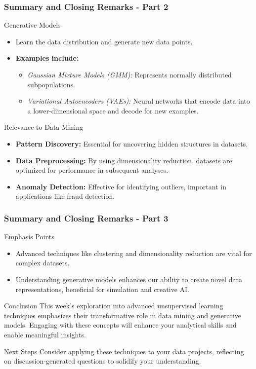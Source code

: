 \documentclass[aspectratio=169]{beamer}
\begin{document}
\begin{frame}[fragile]
  \frametitle{Summary and Closing Remarks - Part 2}
  \begin{block}{Generative Models}
    \begin{itemize}
      \item Learn the data distribution and generate new data points.
      \item \textbf{Examples include:}
      \begin{itemize}
        \item \textit{Gaussian Mixture Models (GMM):} Represents normally distributed subpopulations.
        \item \textit{Variational Autoencoders (VAEs):} Neural networks that encode data into a lower-dimensional space and decode for new examples.
      \end{itemize}
    \end{itemize}
  \end{block}

  \begin{block}{Relevance to Data Mining}
    \begin{itemize}
      \item \textbf{Pattern Discovery:} Essential for uncovering hidden structures in datasets.
      \item \textbf{Data Preprocessing:} By using dimensionality reduction, datasets are optimized for performance in subsequent analyses.
      \item \textbf{Anomaly Detection:} Effective for identifying outliers, important in applications like fraud detection.
    \end{itemize}
  \end{block}
\end{frame}

\begin{frame}[fragile]
  \frametitle{Summary and Closing Remarks - Part 3}
  \begin{block}{Emphasis Points}
    \begin{itemize}
      \item Advanced techniques like clustering and dimensionality reduction are vital for complex datasets.
      \item Understanding generative models enhances our ability to create novel data representations, beneficial for simulation and creative AI.
    \end{itemize}
  \end{block}

  \begin{block}{Conclusion}
    This week's exploration into advanced unsupervised learning techniques emphasizes their transformative role in data mining and generative models. Engaging with these concepts will enhance your analytical skills and enable meaningful insights.
  \end{block}

  \begin{block}{Next Steps}
    Consider applying these techniques to your data projects, reflecting on discussion-generated questions to solidify your understanding.
  \end{block}
\end{frame}
\end{document}
